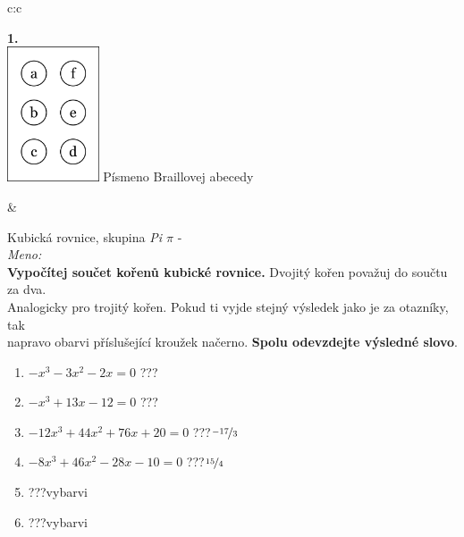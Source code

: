 \documentclass[10pt]{report}
\begin{document}
\begin{tabular}{c:c}
\begin{minipage}[c][99mm][t]{0.49\linewidth}
\begin{center}
\begin{minipage}{0.20\linewidth}
\begin{center}
{\Huge\bfseries 1.} \\[2mm]
\includegraphics[height=40mm]{../images/braille.png}
{\small Písmeno Braillovej abecedy}
\end{center}
\end{minipage}
\end{center}
\end{minipage}
&
\begin{minipage}[c][99mm][t]{0.49\linewidth}
\begin{center}
\vspace{7mm}
{\huge Kubická rovnice, skupina \textit{Pi $\pi$} -}\\[4.5mm]
\textit{Meno:}\phantom{xxxxxxxxxxxxxxxxxxxxxxxxxxxxxxxxxxxxxxxxxxxxxxxxxxxxxxxxxxxxxxxxx}\\[3.5mm]
\textbf{Vypočítej součet kořenů kubické rovnice.} Dvojitý kořen považuj do součtu za dva.\\Analogicky pro trojitý kořen. Pokud ti vyjde stejný výsledek jako je za otazníky, tak\\napravo obarvi příslušející kroužek načerno. \textbf{Spolu odevzdejte výsledné slovo}.\\[3mm]
\begin{minipage}{0.77\linewidth}
\begin{center}
\begin{varwidth}{\textwidth}
\begin{enumerate}
\large
\item $-x^3-3x^2-2x=0$\quad \dotfill\; ???\;\dotfill {}
\item $-x^3+13x-12=0$\quad \dotfill\; ???\;\dotfill {}
\item $-12x^3+44x^2+76x+20=0$\quad \dotfill\; ???\;\dotfill \quad $\nicefrac{-17}{3}$
\item $-8x^3+46x^2-28x-10=0$\quad \dotfill\; ???\;\dotfill \quad $\nicefrac{15}{4}$
\item \quad \dotfill\; ???\;\dotfill \quad vybarvi
\item \quad \dotfill\; ???\;\dotfill \quad vybarvi
\end{enumerate}
\end{varwidth}

\end{center}
\end{minipage}
\end{center}
\end{minipage}
\end{tabular}
\end{document}
